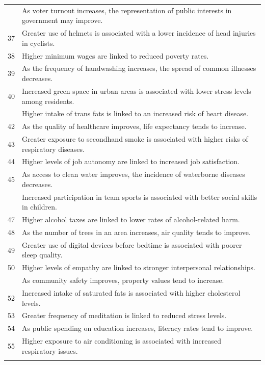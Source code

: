 \documentclass[
  letterpaper,
  DIV=11,
  numbers=noendperiod]{scrartcl}
\begin{document}
\begin{longtable}[t]{r>{\raggedright\arraybackslash}p{35em}}
\addlinespace
36 & As voter turnout increases, the representation of public interests in government may improve.\\
37 & Greater use of helmets is associated with a lower incidence of head injuries in cyclists.\\
38 & Higher minimum wages are linked to reduced poverty rates.\\
39 & As the frequency of handwashing increases, the spread of common illnesses decreases.\\
40 & Increased green space in urban areas is associated with lower stress levels among residents.\\
\addlinespace
41 & Higher intake of trans fats is linked to an increased risk of heart disease.\\
42 & As the quality of healthcare improves, life expectancy tends to increase.\\
43 & Greater exposure to secondhand smoke is associated with higher risks of respiratory diseases.\\
44 & Higher levels of job autonomy are linked to increased job satisfaction.\\
45 & As access to clean water improves, the incidence of waterborne diseases decreases.\\
\addlinespace
46 & Increased participation in team sports is associated with better social skills in children.\\
47 & Higher alcohol taxes are linked to lower rates of alcohol-related harm.\\
48 & As the number of trees in an area increases, air quality tends to improve.\\
49 & Greater use of digital devices before bedtime is associated with poorer sleep quality.\\
50 & Higher levels of empathy are linked to stronger interpersonal relationships.\\
\addlinespace
51 & As community safety improves, property values tend to increase.\\
52 & Increased intake of saturated fats is associated with higher cholesterol levels.\\
53 & Greater frequency of meditation is linked to reduced stress levels.\\
54 & As public spending on education increases, literacy rates tend to improve.\\
55 & Higher exposure to air conditioning is associated with increased respiratory issues.\\
\addlinespace

\end{longtable}
\end{document}
